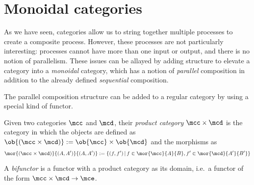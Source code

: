 \section{Monoidal categories}

As we have seen, categories allow us to string together multiple processes to
create a composite process.
However, these processes are not particularly interesting: processes cannot have
more than one input or output, and there is no notion of parallelism.
These issues can be allayed by adding structure to elevate a category into a
\emph{monoidal} category, which has a notion of \emph{parallel} composition in
addition to the already defined \emph{sequential} composition.

The parallel composition structure can be added to a regular category by using
a special kind of functor.

\begin{definition}
    Given two categories \(\mcc\) and \(\mcd\), their \emph{product category}
    \(\mcc \times \mcd\) is the category in which the objects are defined as \(
        \ob{(\mcc \times \mcd)} := \ob{\mcc} \times \ob{\mcd}
    \) and the morphisms as \[
        \mor{(\mcc \times \mcd)}{(A, A^\prime)}{(A, A^\prime)}
        :=
        \{
            (f, f^\prime)
            \,|\,
            f \in \mor{\mcc}{A}{B},
            f^\prime \in \mor{\mcd}{A^\prime}{B^\prime}
        \}
    \]
\end{definition}

\begin{definition}[Bifunctor]
    A \emph{bifunctor} is a functor with a product category as its domain, i.e.\
    a functor of the form \(\mcc \times \mcd \to \mce\).
\end{definition}

